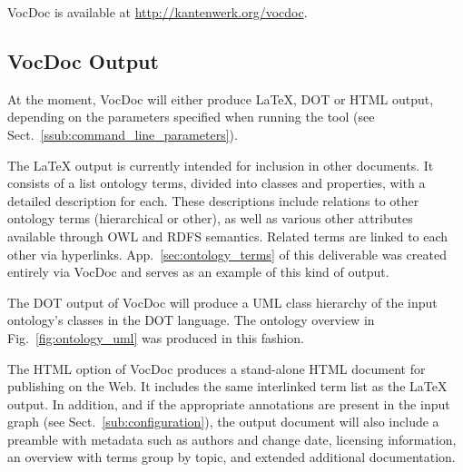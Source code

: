 \documentclass{article}
\begin{document}
VocDoc is available at \url{http://kantenwerk.org/vocdoc}.

\subsection{VocDoc Output} %
\label{sub:vocdoc_output}

At the moment, VocDoc will either produce La\TeX{}, DOT or HTML output, depending on the parameters specified when running the tool (see Sect.~\ref{ssub:command_line_parameters}). 

The La\TeX{} output is currently intended for inclusion in other documents. It consists of a list ontology terms, divided into classes and properties, with a detailed description for each. These descriptions include relations to other ontology terms (hierarchical or other), as well as various other attributes available through OWL and RDFS semantics. Related terms are linked to each other via hyperlinks. App.~\ref{sec:ontology_terms} of this deliverable was created entirely via VocDoc and serves as an example of this kind of output.

The DOT output of VocDoc will produce a UML class hierarchy of the input ontology's classes in the DOT language. The ontology overview in Fig.~\ref{fig:ontology_uml} was produced in this fashion.

The HTML option of VocDoc produces a stand-alone HTML document for publishing on the Web. It includes the same interlinked term list as the La\TeX{} output. In addition, and if the appropriate annotations are present in the input graph (see Sect.~\ref{sub:configuration}), the output document will also include a preamble with metadata such as authors and change date, licensing information, an overview with terms group by topic, and extended additional documentation.
\end{document}
